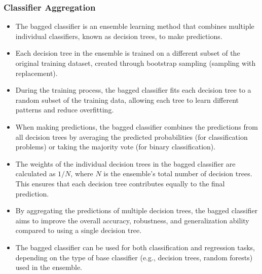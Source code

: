 \documentclass[11pt,aspectratio=1610,usenames,dvipsnames]{beamer} %
\begin{document}
\begin{frame}[allowframebreaks]
	\frametitle{Classifier Aggregation}

	\begin{itemize}
		\item The bagged classifier is an ensemble learning method that combines multiple individual classifiers, known as decision trees, to make predictions.
		\item Each decision tree in the ensemble is trained on a different subset of the original training dataset, created through bootstrap sampling (sampling with replacement).
		\item During the training process, the bagged classifier fits each decision tree to a random subset of the training data, allowing each tree to learn different patterns and reduce overfitting.
		\item When making predictions, the bagged classifier combines the predictions from all decision trees by averaging the predicted probabilities (for classification problems) or taking the majority vote (for binary classification).
		\item The weights of the individual decision trees in the bagged classifier are calculated as $1/N$, where $N$ is the ensemble's total number of decision trees. This ensures that each decision tree contributes equally to the final prediction.
		\item By aggregating the predictions of multiple decision trees, the bagged classifier aims to improve the overall accuracy, robustness, and generalization ability compared to using a single decision tree.
		\item The bagged classifier can be used for both classification and regression tasks, depending on the type of base classifier (e.g., decision trees, random forests) used in the ensemble.
		\end{itemize}

\end{frame}
\end{document}
